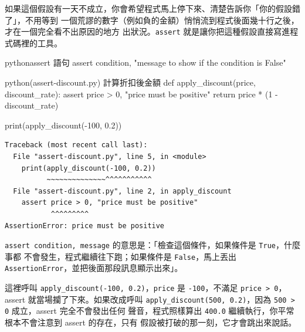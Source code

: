 如果這個假設有一天不成立，你會希望程式馬上停下來、清楚告訴你「你的假設錯了」，不用等到
一個荒謬的數字（例如負的金額）悄悄流到程式後面幾十行之後，才在一個完全看不出原因的地方
出狀況。\texttt{assert} 就是讓你把這種假設直接寫進程式碼裡的工具。

\begin{code}{python}{assert 語句}
assert condition, "message to show if the condition is False"
\end{code}

\begin{example}{python}{(assert-discount.py) 計算折扣後金額}
def apply_discount(price, discount_rate):
    assert price > 0, "price must be positive"
    return price * (1 - discount_rate)

print(apply_discount(-100, 0.2))
\end{example}

\begin{verbatim}
Traceback (most recent call last):
  File "assert-discount.py", line 5, in <module>
    print(apply_discount(-100, 0.2))
          ~~~~~~~~~~~~~~^^^^^^^^^^^
  File "assert-discount.py", line 2, in apply_discount
    assert price > 0, "price must be positive"
           ^^^^^^^^^
AssertionError: price must be positive
\end{verbatim}

\texttt{assert condition, message} 的意思是：「檢查這個條件，如果條件是 \texttt{True}，什麼事都
不會發生，程式繼續往下跑；如果條件是 \texttt{False}，馬上丟出
\texttt{AssertionError}，並把後面那段訊息顯示出來」。

這裡呼叫 \texttt{apply\_discount(-100, 0.2)}，\texttt{price} 是 \texttt{-100}，不滿足
\texttt{price > 0}，assert 就當場攔了下來。如果改成呼叫
\texttt{apply\_discount(500, 0.2)}，因為 \texttt{500 > 0} 成立，assert 完全不會發出任何
聲音，程式照樣算出 \texttt{400.0} 繼續執行，你平常根本不會注意到 assert 的存在，只有
假設被打破的那一刻，它才會跳出來說話。



